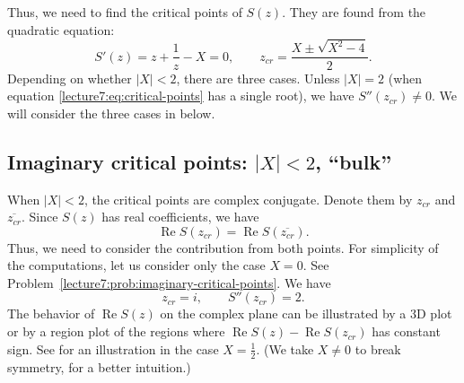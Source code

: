 \documentclass[letterpaper,11pt,oneside,reqno]{book}
\numberwithin{equation}{chapter}  %
\theoremstyle{definition}
\begin{document}
Thus, we need to find the critical points of $S(z)$.
They are found from the quadratic equation:
\begin{equation}
	\label{lecture7:eq:critical-points}
	S'(z)=z+\frac{1}{z}-X=0,\qquad
	z_{cr}=\frac{X\pm \sqrt{X^2-4}}{2}.
\end{equation}
Depending on whether $|X|<2$, there are three cases.
Unless $|X|=2$ (when equation \eqref{lecture7:eq:critical-points} has a single root), we have
$S''(z_{cr})\ne 0$.
We will consider the three cases in
below.

\subsection{Imaginary critical points: \texorpdfstring{$|X|<2$, ``bulk''}{|X|<2, bulk}}
\label{lecture7:sub:imaginary-critical-points}

When $|X|<2$, the critical points are complex conjugate.
Denote them by $z_{cr}$ and $\overline{z_{cr}}$.
Since $S(z)$ has real coefficients, we have
\begin{equation*}
	\operatorname{Re}S(z_{cr})=\operatorname{Re}S(\overline{z_{cr}}).
\end{equation*}
Thus, we need to consider the contribution from both points.
For simplicity of the computations, let us consider only the case $X=0$.
See Problem~\ref{lecture7:prob:imaginary-critical-points}.
We have
\begin{equation*}
	z_{cr}=i,\qquad
	S''(z_{cr})=2.
\end{equation*}
The behavior of $\operatorname{Re}S(z)$ on the complex plane
can be illustrated by a 3D plot or by a region plot of the regions
where $\operatorname{Re}S(z)-\operatorname{Re}S(z_{cr})$ has constant sign.
See  for an illustration in the case $X=\frac{1}{2}$.
(We take $X\ne 0$ to break symmetry, for a better intuition.)
\end{document}
